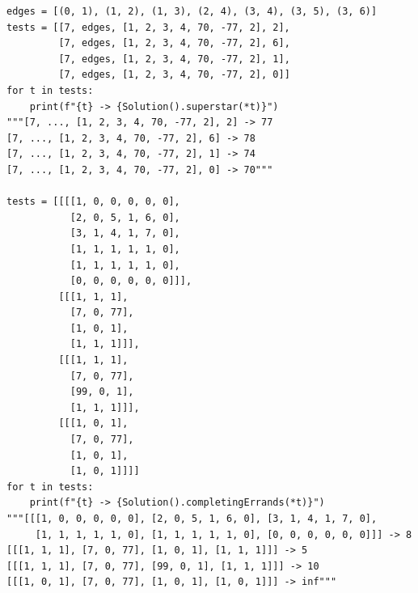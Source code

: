 \documentclass[12pt]{article}
\begin{document}
\begin{verbatim}
edges = [(0, 1), (1, 2), (1, 3), (2, 4), (3, 4), (3, 5), (3, 6)]
tests = [[7, edges, [1, 2, 3, 4, 70, -77, 2], 2],
         [7, edges, [1, 2, 3, 4, 70, -77, 2], 6],
         [7, edges, [1, 2, 3, 4, 70, -77, 2], 1],
         [7, edges, [1, 2, 3, 4, 70, -77, 2], 0]]
for t in tests:
    print(f"{t} -> {Solution().superstar(*t)}")
"""[7, ..., [1, 2, 3, 4, 70, -77, 2], 2] -> 77
[7, ..., [1, 2, 3, 4, 70, -77, 2], 6] -> 78
[7, ..., [1, 2, 3, 4, 70, -77, 2], 1] -> 74
[7, ..., [1, 2, 3, 4, 70, -77, 2], 0] -> 70"""

tests = [[[[1, 0, 0, 0, 0, 0],
           [2, 0, 5, 1, 6, 0],
           [3, 1, 4, 1, 7, 0],
           [1, 1, 1, 1, 1, 0],
           [1, 1, 1, 1, 1, 0],
           [0, 0, 0, 0, 0, 0]]],
         [[[1, 1, 1],
           [7, 0, 77],
           [1, 0, 1],
           [1, 1, 1]]],
         [[[1, 1, 1],
           [7, 0, 77],
           [99, 0, 1],
           [1, 1, 1]]],
         [[[1, 0, 1],
           [7, 0, 77],
           [1, 0, 1],
           [1, 0, 1]]]]
for t in tests:
    print(f"{t} -> {Solution().completingErrands(*t)}")
"""[[[1, 0, 0, 0, 0, 0], [2, 0, 5, 1, 6, 0], [3, 1, 4, 1, 7, 0],
     [1, 1, 1, 1, 1, 0], [1, 1, 1, 1, 1, 0], [0, 0, 0, 0, 0, 0]]] -> 8
[[[1, 1, 1], [7, 0, 77], [1, 0, 1], [1, 1, 1]]] -> 5
[[[1, 1, 1], [7, 0, 77], [99, 0, 1], [1, 1, 1]]] -> 10
[[[1, 0, 1], [7, 0, 77], [1, 0, 1], [1, 0, 1]]] -> inf"""
\end{verbatim}
\end{document}
